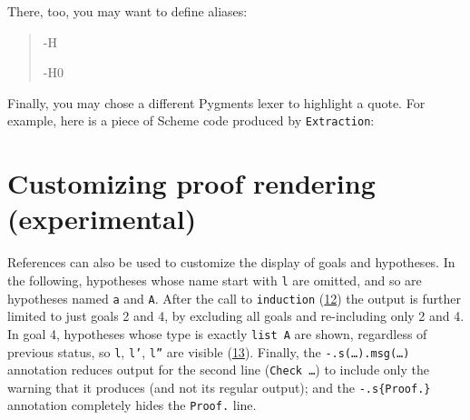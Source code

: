 \documentclass[a4paper]{article}
\begin{document}
There, too, you may want to define aliases:

\begin{quote}
\begin{alectryon}
  \hyp{H}{~~}
\end{alectryon}

\begin{alectryon}
  \hyp{H0}{~~}
\end{alectryon}
\end{quote}

Finally, you may chose a different Pygments lexer to highlight a quote.  For example, here is a piece of Scheme code produced by \texttt{Extraction}:

\begin{quote}
\begin{alectryon}
  \begin{message}
    \nl
    \nl
    \nl
    \nl
    \nl
  \end{message}
\end{alectryon}
\end{quote}


\section{Customizing proof rendering (\textbf{experimental})%
  \label{customizing-proof-rendering-experimental}%
}

References can also be used to customize the display of goals and hypotheses.  In the following, hypotheses whose name start with \texttt{l} are omitted, and so are hypotheses named \texttt{a} and \texttt{A}.  After the call to \texttt{induction} (\hyperref[references-rst-io-pr-s-induction-1-0]{12}) the output is further limited to just goals 2 and 4, by excluding all goals and re-including only 2 and 4.  In goal 4, hypotheses whose type is exactly \texttt{list A} are shown, regardless of previous status, so \texttt{l}, \texttt{l'}, \texttt{l''} are visible (\hyperref[references-rst-io-pr-s-induction-1-g-4-h-l-0]{13}).  Finally, the \texttt{-.s(…).msg(…)} annotation reduces output for the second line (\texttt{Check …}) to include only the warning that it produces (and not its regular output); and the \texttt{-.s\{Proof.\}} annotation completely hides the \texttt{Proof.} line.
\end{document}
